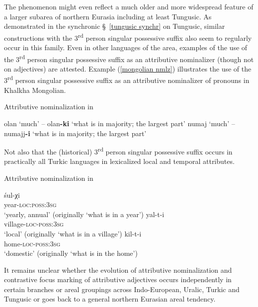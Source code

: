 The phenomenon might even reflect a much older and more widespread feature of a larger subarea of northern Eurasia including at least Tungusic. As demonstrated in the synchronic \S~\ref{tungusic synchr} on Tungusic, similar constructions with the 3\textsuperscript{rd} person singular possessive suffix also seem to regularly occur in this family. Even in other languages of the area, examples of the use of the 3\textsuperscript{rd} person singular possessive suffix as an attributive nominalizer (though not on adjectives) are attested. Example (\ref{mongolian nmlz}) illustrates the use of the 3\textsuperscript{rd} person singular possessive suffix as an attributive nominalizer of pronouns in Khalkha Mongolian.
\begin{exe} \label{mongolian nmlz}
\ex \rm{Attributive nominalization in }
\begin{xlist}
\ex	olan ‘much’ – olan\textbf{-ki} ‘what is in majority; the largest part’
\ex	numaj ‘much’ – numajj\textbf{-i} ‘what is in majority; the largest part’
\end{xlist}
\end{exe}
Not also that the (historical) 3\textsuperscript{rd} person singular possessive suffix occurs in practically all Turkic languages in lexicalized local and temporal attributes. 
\begin{exe}
\ex \rm{Attributive nominalization in }
\begin{xlist}
\ex
\gll	śul-χi\\
	year-\textsc{loc:poss:3sg}\\
\glt	‘yearly, annual’ (originally ‘what is in a year’)
\ex
\gll	yal-t-i\\
	village-\textsc{loc-poss:3sg}\\
\glt	‘local’ (originally ‘what is in a village’)
\ex
\gll	kil-t-i\\
	home-\textsc{loc-poss:3sg}\\
\glt	‘domestic’ (originally ‘what is in the home’)
\end{xlist}
\end{exe}
It remains unclear whether the evolution of attributive nominalization and contrastive focus marking of attributive adjectives occurs independently in certain branches or areal groupings across Indo-European, Uralic, Turkic and Tungusic or goes back to a general northern Eurasian areal tendency.

